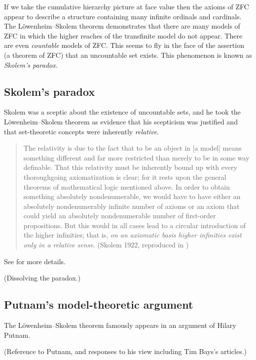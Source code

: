 \documentclass[10pt, a4paper, oneside]{article}
\theoremstyle{definition}
\theoremstyle{remark}
\theoremstyle{plain}
\theoremstyle{plain}
\begin{document}
If we take the cumulative hierarchy picture at face value then the axioms of ZFC
appear to describe a structure containing many infinite ordinals and cardinals.
The Löwenheim--Skolem theorem demonstrates that there are many models of ZFC in
which the higher reaches of the transfinite model do not appear. There are even
\emph{countable} models of ZFC. This seems to fly in the face of the assertion
(a theorem of ZFC) that an uncountable set exists. This phenomenon is known as
\emph{Skolem's paradox}.

\subsection{Skolem's paradox}

Skolem was a sceptic about the existence of uncountable sets, and he took the
Löwenheim--Skolem theorem as evidence that his scepticism was justified and
that set-theoretic concepts were inherently \emph{relative}.

\begin{quote}
    The relativity is due to the fact that to be an object in [a model] means
    something different and far more restricted than merely to be in some way
    definable. That this relativity must be inherently bound up with every
    thoroughgoing axiomatization is clear; for it rests upon the general
    theorems of mathematical logic mentioned above. In order to obtain something
    absolutely nondenumerable, we would have to have either an absolutely
    nondenumerably infinite number of axioms or an axiom that could yield an
    absolutely nondenumerable number of first-order propositions. But this would
    in all cases lead to a circular introduction of the higher infinities; that
    is, \emph{on an axiomatic basis higher infinities exist only in a relative
    sense}.
    (Skolem 1922, reproduced in \citet[p. 296]{vanheijenoort})
\end{quote}

See \citet{jane2001} for more details.

(Dissolving the paradox.)

\subsection{Putnam's model-theoretic argument}

The Löwenheim--Skolem theorem famously appears in an argument of Hilary Putnam.

(Reference to Putnam, and responses to his view including Tim Bays's articles.)
\end{document}
